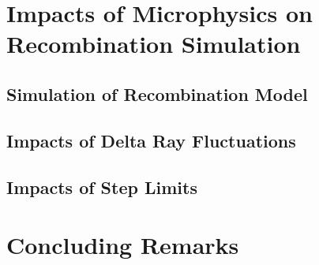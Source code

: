 \section{Impacts of Microphysics on Recombination Simulation}

\subsection{Simulation of Recombination Model}

\subsection{Impacts of Delta Ray Fluctuations}

\subsection{Impacts of Step Limits}


\section{Concluding Remarks}



